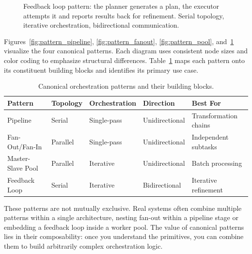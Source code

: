 \begin{figure}[t]
\centering
{}
\caption{Feedback loop pattern: the planner generates a plan, the executor attempts it and reports results back for refinement. Serial topology, iterative orchestration, bidirectional communication.}
\label{fig:pattern_feedback}
\end{figure}

Figures~\ref{fig:pattern_pipeline}, \ref{fig:pattern_fanout}, \ref{fig:pattern_pool}, and~\ref{fig:pattern_feedback} visualize the four canonical patterns. Each diagram uses consistent node sizes and color coding to emphasize structural differences. Table~\ref{tab:pattern_decision} maps each pattern onto its constituent building blocks and identifies its primary use case.

\begin{table}[t]
\centering
\caption{Canonical orchestration patterns and their building blocks.}
\label{tab:pattern_decision}
\begin{tabularx}{\textwidth}{lXlll}
\toprule
\textbf{Pattern} & \textbf{Topology} & \textbf{Orchestration} & \textbf{Direction} & \textbf{Best For} \\
\midrule
Pipeline & Serial & Single-pass & Unidirectional & Transformation chains \\
Fan-Out/Fan-In & Parallel & Single-pass & Unidirectional & Independent subtasks \\
Master-Slave Pool & Parallel & Iterative & Unidirectional & Batch processing \\
Feedback Loop & Serial & Iterative & Bidirectional & Iterative refinement \\
\bottomrule
\end{tabularx}
\end{table}

These patterns are not mutually exclusive. Real systems often combine multiple patterns within a single architecture, nesting fan-out within a pipeline stage or embedding a feedback loop inside a worker pool. The value of canonical patterns lies in their composability: once you understand the primitives, you can combine them to build arbitrarily complex orchestration logic.

